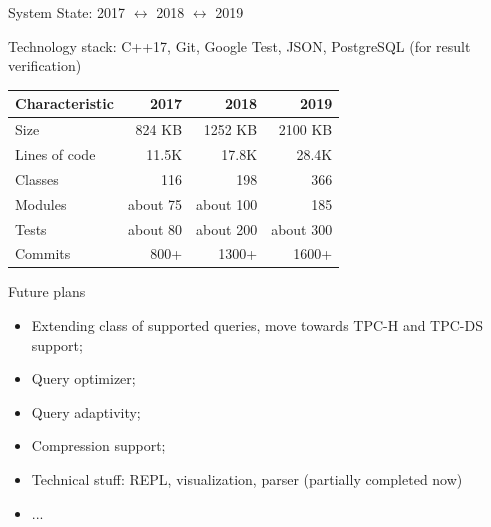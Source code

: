 \documentclass[compress, dvipsnames, unicode]{beamer}
\begin{document}
\begin{frame}{System State: 2017 $\longleftrightarrow$ 2018 $\longleftrightarrow$ 2019}

Technology stack: C++17, Git, Google Test, JSON, PostgreSQL (for result verification)


\begin{center}
	\begin{tabular}{| l | r | r | r |}
		\hline
		Characteristic & 2017      & 2018       & 2019       \\ \hline     \hline
		Size           & 824 KB    & 1252 KB    & 2100 KB    \\ \hline
		Lines of code  & 11.5K     & 17.8K      & 28.4K      \\ \hline
		Classes        & 116       & 198        & 366        \\ \hline
		Modules        & about 75  & about 100  & 185        \\ \hline
		Tests          & about 80  & about 200  & about 300  \\ \hline
		Commits        & 800+      & 1300+      & 1600+      \\ \hline
	\end{tabular}
\end{center}

			


\end{frame}



\begin{frame}{Future plans}

\begin{itemize}
\setlength\itemsep{0.5em}
\item Extending class of supported queries, move towards TPC-H and TPC-DS support;
\item Query optimizer;
\item Query adaptivity;
\item Compression support;
\item Technical stuff: REPL, visualization, parser (partially completed now)
\item ...
\end{itemize}
\end{frame}
\end{document}
